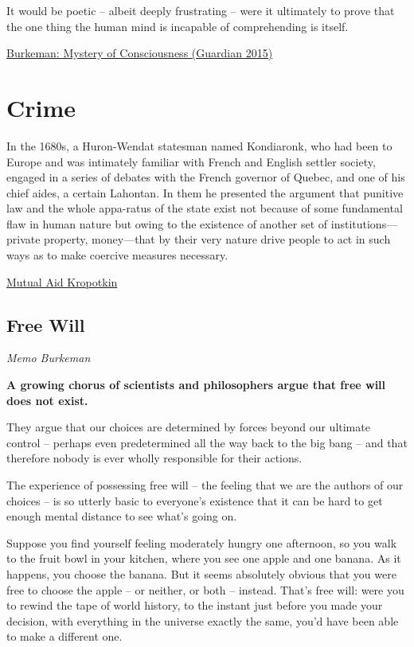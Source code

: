 \documentclass[
]{book}
\begin{document}
It would be poetic -- albeit deeply frustrating -- were it ultimately to prove that the one thing the human mind is incapable of comprehending is itself.

\href{https://www.theguardian.com/science/2015/jan/21/-sp-why-cant-worlds-greatest-minds-solve-mystery-consciousness}{Burkeman: Mystery of Consciousness (Guardian 2015)}

\hypertarget{crime}{%
\chapter{Crime}\label{crime}}

In the 1680s, a Huron-Wendat statesman named Kondiaronk, who had been to Europe and was intimately familiar with French and English settler society, engaged in a series of debates with the French governor of Quebec, and one of his chief aides, a certain Lahontan. In them he presented the argument that punitive law and the whole appa-ratus of the state exist not because of some fundamental flaw in human nature but owing to the existence of another set of institutions---private property, money---that by their very nature drive people to act in such ways as to make coercive measures necessary.

\href{https://theanarchistlibrary.org/library/andrej-grubacic-david-graeber-introduction-to-mutual-aid}{Mutual Aid Kropotkin}

\hypertarget{free-will}{%
\section{Free Will}\label{free-will}}

\emph{Memo Burkeman}

\textbf{A growing chorus of scientists and philosophers argue that free will does not exist.}

They argue that our choices are determined by forces beyond our ultimate control -- perhaps even predetermined all the way back to the big bang -- and that therefore nobody is ever wholly responsible for their actions.

The experience of possessing free will -- the feeling that we are the authors of our choices -- is so utterly basic to everyone's existence that it can be hard to get enough mental distance to see what's going on.

Suppose you find yourself feeling moderately hungry one afternoon, so you walk to the fruit bowl in your kitchen, where you see one apple and one banana. As it happens, you choose the banana. But it seems absolutely obvious that you were free to choose the apple -- or neither, or both -- instead. That's free will: were you to rewind the tape of world history, to the instant just before you made your decision, with everything in the universe exactly the same, you'd have been able to make a different one.
\end{document}
